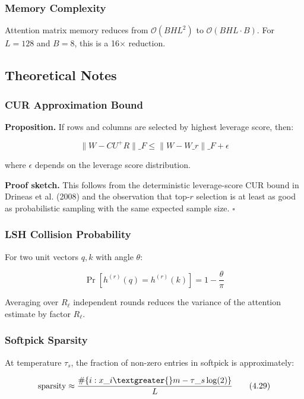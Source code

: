 \subsubsection{Memory Complexity}

Attention matrix memory reduces from $\mathcal{O}(B H L^2)$ to 
$\mathcal{O}(B H L \cdot B)$. For $L = 128$ and $B = 8$, this is a 16$\times$ reduction.

\subsection{Theoretical Notes}

\subsubsection{CUR Approximation Bound}

\textbf{Proposition.} If rows and columns are selected by highest leverage score, then:

\[
\|W - C U^+ R\|\_F \leq \|W - W\_r\|\_F + \epsilon
\tag{4.27}
\]

where $\epsilon$ depends on the leverage score distribution.

\textbf{Proof sketch.} This follows from the deterministic leverage-score CUR bound 
in Drineas et al. (2008) and the observation that top-$r$ selection is at least 
as good as probabilistic sampling with the same expected sample size. $\square$

\subsubsection{LSH Collision Probability}

For two unit vectors $q, k$ with angle $\theta$:

\[
\Pr[h^{(r)}(q) = h^{(r)}(k)] = 1 - \frac{\theta}{\pi}
\tag{4.28}
\]

Averaging over $R_\ell$ independent rounds reduces the variance of the 
attention estimate by factor $R_\ell$.

\subsubsection{Softpick Sparsity}

At temperature $\tau_s$, the fraction of non-zero entries in softpick is 
approximately:

\[
\text{sparsity} \approx \frac{\#\{i : x\_i \textgreater{} m - \tau\_s \log(2)\}}{L}
\tag{4.29}
\]

